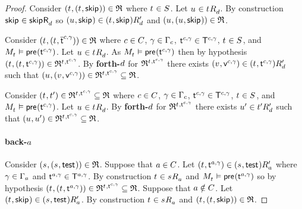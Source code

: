 \begin{proof}
Consider $(\kStateT, (\kStateT, \aStateSkip)) \in \refinement$ where $\kStateT \in \kStates$.
Let $\kStateU \in \kSuccessorsD{\kStateT}$.
By construction $\aStateSkip \in \aSuccessorsD{\aStateSkip}$ so $(\kStateU, \aStateSkip) \in \kSuccessorsPD{(\kStateT, \aStateSkip)}$ and $(\kStateU, (\kStateU, \aStateSkip)) \in \refinement$.

Consider $(\kStateT, (\kStateT, \aPStateT[\agentC, \gamma])) \in \refinement$ where $\agentC \in \agentsC$, $\gamma \in \Gamma_\agentC$, $\aStateT[\agentC, \gamma] \in \aStatesT[\agentC, \gamma]$, $\kStateT \in \kStates$, and $\kPModel{\kStateT} \entails \aPrecondition(\aStateT[\agentC, \gamma])$.
Let $\kStateU \in \kSuccessorsD{\kStateT}$.
As $\kPModel{\kStateT} \entails \aPrecondition(\aStateT[\agentC, \gamma])$ then by hypothesis $(\kStateT, (\kStateT, \aStateT[\agentC, \gamma])) \in \refinement^{\kStateT, \aStateT[\agentC, \gamma]}$.
By {\bf forth-$\agentD$} for $\refinement^{\kStateT, \aStateT[\agentC, \gamma]}$ there exists $(\kStateV, \aStateV[\agentC, \gamma]) \in \kSuccessorsPD{(\kStateT, \aStateT[\agentC, \gamma])}$ such that $(\kStateU, (\kStateV, \aStateV[\agentC, \gamma])) \in \refinement^{\kStateT, \aStateT[\agentC, \gamma]} \subseteq \refinement$.

Consider $(\kStateT, \kStateTP) \in \refinement^{\kStateT, \aStateT[\agentC, \gamma]} \subseteq \refinement$ where $\agentC \in \agentsC$, $\gamma \in \Gamma_\agentC$, $\aStateT[\agentC, \gamma] \in \aStatesT[\agentC, \gamma]$, $\kStateT \in \kStates$, and $\kPModel{\kStateT} \entails \aPrecondition(\aStateT[\agentC, \gamma])$.
Let $\kStateU \in \kSuccessorsD{\kStateT}$.
By {\bf forth-$\agentD$} for $\refinement^{\kStateT, \aStateT[\agentC, \gamma]}$ there exists $\kStateUP \in \kSuccessorsPD{\kStateTP}$ such that $(\kStateU, \kStateUP) \in \refinement^{\kStateT, \aStateT[\agentC, \gamma]} \subseteq \refinement$.

\paragraph{back-$\agentA$}
Consider $(\kStateS, (\kStateS, \aStateTest)) \in \refinement$.
Suppose that $\agentA \in \agentsC$.
Let $(\kStateT, \aStateT[\agentA, \gamma]) \in \kSuccessorsPA{(\kStateS, \aStateTest)}$ where $\gamma \in \Gamma_\agentA$ and $\aStateT[\agentA, \gamma] \in \aStatesT[\agentA, \gamma]$.
By construction $\kStateT \in \kSuccessorsA{\kStateS}$ and $\kPModel{\kStateT} \entails \aPrecondition(\aStateT[\agentA, \gamma])$ so by hypothesis $(\kStateT, (\kStateT, \aStateT[\agentA, \gamma])) \in \refinement^{\kStateT, \aStateT[\agentC, \gamma]} \subseteq \refinement$.
Suppose that $\agentA \notin \agentsC$.
Let $(\kStateT, \aStateSkip) \in \kSuccessorsPA{(\kStateS, \aStateTest)}$.
By construction $\kStateT \in \kSuccessorsA{\kStateS}$ and $(\kStateT, (\kStateT, \aStateSkip)) \in \refinement$.


\end{proof}
